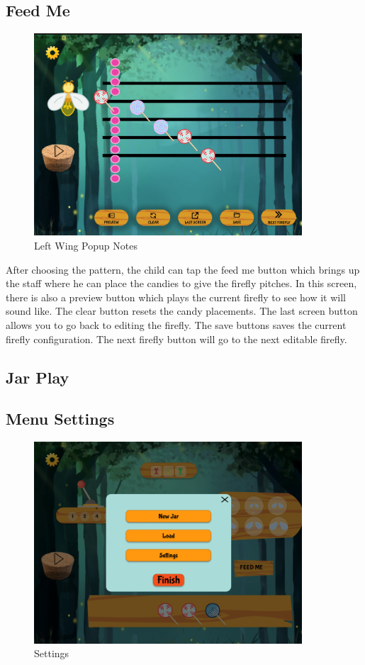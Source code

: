 \subsection{Feed Me}

\begin{figure}[H]
    \centering
    \includegraphics[width=10cm]{figures/newScreenFlows/newfeedme.png}
    \caption{Left Wing Popup Notes}
    \label{fig:newleftwing}
\end{figure}

After choosing the pattern, the child can tap the feed me button which brings up the staff where he can place the candies to give the firefly pitches. In this screen, there is also a preview button which plays the current firefly to see how it will sound like. The clear button resets the candy placements. The last screen button allows you to go back to editing the firefly. The save buttons saves the current firefly configuration. The next firefly button will go to the next editable firefly.

\subsection{Jar Play}



\subsection{Menu Settings}

\begin{figure}[H]
    \centering
    \includegraphics[width=10cm]{figures/newScreenFlows/newmainsettings.png}
    \caption{Settings}
    \label{fig:newsettings}
\end{figure}

